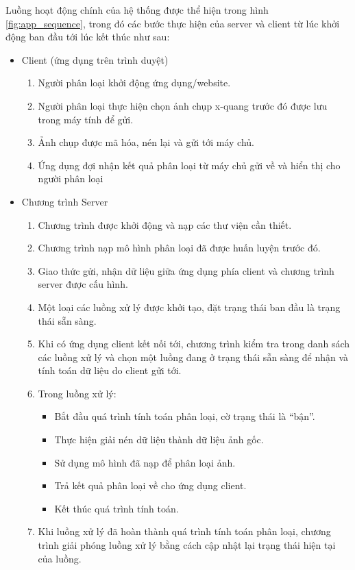 Luồng hoạt động chính của hệ thống được thể hiện trong hình \ref{fig:app_sequence}, trong đó các bước thực hiện của server và client từ lúc khởi động ban đầu tới lúc kết thúc như sau:
\begin{itemize}
	\item Client (ứng dụng trên trình duyệt)
	\begin{enumerate}
		\item Người phân loại khởi động ứng dụng/website.
		\item Người phân loại thực hiện chọn ảnh chụp x-quang trước đó được lưu trong máy tính để gửi.
		\item Ảnh chụp được mã hóa, nén lại và gửi tới máy chủ.
		\item Ứng dụng đợi nhận kết quả phân loại từ máy chủ gửi về và hiển thị cho người phân loại
	\end{enumerate}
	\item Chương trình Server
	\begin{enumerate}
		\item Chương trình được khởi động và nạp các thư viện cần thiết.
		\item Chương trình nạp mô hình phân loại đã được huấn luyện trước đó.
		\item Giao thức gửi, nhận dữ liệu giữa ứng dụng phía client và chương trình server được cấu hình.
		\item Một loại các luồng xử lý được khởi tạo, đặt trạng thái ban đầu là trạng thái sẵn sàng.
		\item Khi có ứng dụng client kết nối tới, chương trình kiểm tra trong danh sách các luồng xử lý và chọn một luồng đang ở trạng thái sẵn sàng để nhận và tính toán dữ liệu do client gửi tới.
		\item Trong luồng xử lý:
		\begin{itemize}
			\item Bắt đầu quá trình tính toán phân loại, cờ trạng thái là “bận”.
			\item Thực hiện giải nén dữ liệu thành dữ liệu ảnh gốc.
			\item Sử dụng mô hình đã nạp để phân loại ảnh.
			\item Trả kết quả phân loại về cho ứng dụng client.
			\item Kết thúc quá trình tính toán.
		\end{itemize}
		\item Khi luồng xử lý đã hoàn thành quá trình tính toán phân loại, chương trình giải phóng luồng xử lý bằng cách cập nhật lại trạng thái hiện tại của luồng.
	\end{enumerate}
\end{itemize}
